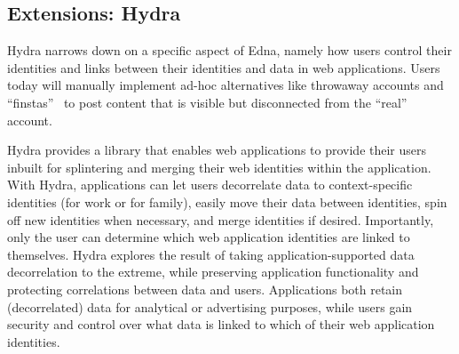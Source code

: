 \subsection{Extensions: Hydra}

Hydra narrows down on a specific aspect of Edna, namely how users control their
identities and links between their identities and data in web applications.
Users today will manually implement ad-hoc alternatives like throwaway accounts
and ``finstas''~\cite{reddit:throwaway, nytimes:finsta} to post content that is
visible but disconnected from the ``real'' account. 

Hydra provides a library that enables web applications to provide their
users inbuilt for splintering and merging their web identities within the
application. With Hydra, applications can let users decorrelate data to
context-specific identities (\eg for work or for family), easily
move their data between identities, spin off new identities when necessary, and
merge identities if desired. Importantly, only the user can determine which
web application identities are linked to themselves.
%
Hydra explores the result of taking application-supported data
decorrelation to the extreme, while preserving application functionality and
protecting correlations between data and users. Applications both retain
(decorrelated) data for \eg analytical or advertising purposes, while users gain
security and control over what data is linked to which of their web application
identities.



